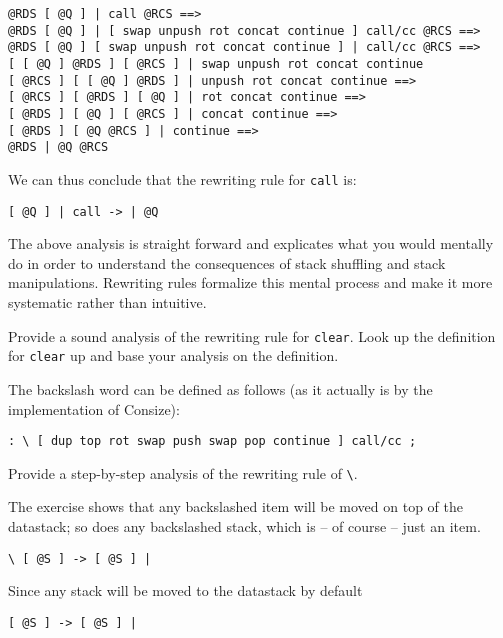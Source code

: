 \begin{verbatim}
@RDS [ @Q ] | call @RCS ==>
@RDS [ @Q ] | [ swap unpush rot concat continue ] call/cc @RCS ==>
@RDS [ @Q ] [ swap unpush rot concat continue ] | call/cc @RCS ==>
[ [ @Q ] @RDS ] [ @RCS ] | swap unpush rot concat continue
[ @RCS ] [ [ @Q ] @RDS ] | unpush rot concat continue ==>
[ @RCS ] [ @RDS ] [ @Q ] | rot concat continue ==>
[ @RDS ] [ @Q ] [ @RCS ] | concat continue ==>
[ @RDS ] [ @Q @RCS ] | continue ==>
@RDS | @Q @RCS
\end{verbatim}

We can thus conclude that the rewriting rule for \verb|call| is:

\begin{verbatim}
[ @Q ] | call -> | @Q
\end{verbatim}

The above analysis is straight forward and explicates what you would mentally do in order to understand the consequences of stack shuffling and stack manipulations. Rewriting rules formalize this mental process and make it more systematic rather than intuitive.

\begin{exercise}\label{ex:clearB}
Provide a sound analysis of the rewriting rule for \verb|clear|. Look up the definition for \verb|clear| up and base your analysis on the definition.
\end{exercise} 

\begin{exercise}\label{ex:backslash}
The backslash word can be defined as follows (as it actually is by the implementation of Consize):
\begin{verbatim}
: \ [ dup top rot swap push swap pop continue ] call/cc ;
\end{verbatim}
Provide a step-by-step analysis of the rewriting rule of \verb|\|.
\end{exercise}

The exercise shows that any backslashed item will be moved on top of the datastack; so does any backslashed stack, which is -- of course -- just an item.

\begin{verbatim}
\ [ @S ] -> [ @S ] |
\end{verbatim}

Since any stack will be moved to the datastack by default

\begin{verbatim}
[ @S ] -> [ @S ] |
\end{verbatim}

